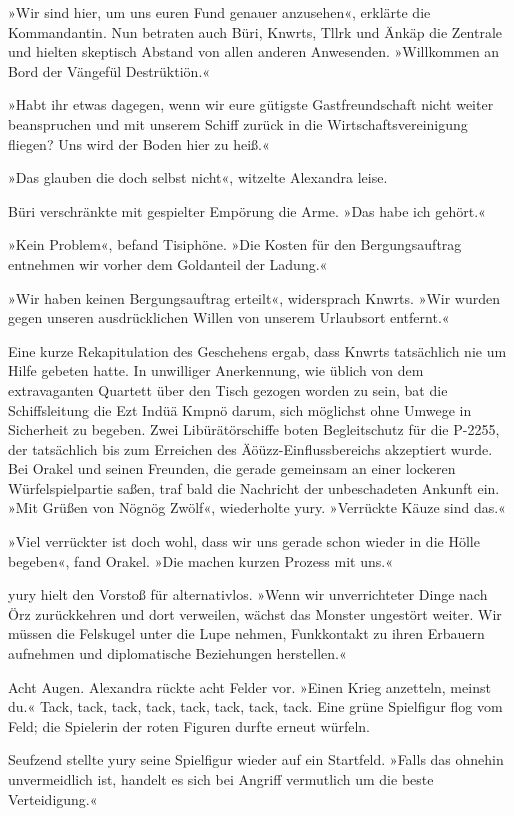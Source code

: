 »Wir sind hier, um uns euren Fund genauer anzusehen«, erklärte die Kommandantin. Nun betraten auch Büri, Knwrts, Tllrk und Änkäp die Zentrale und hielten skeptisch Abstand von allen anderen Anwesenden. »Willkommen an Bord der Vängefül Destrüktiön.«

»Habt ihr etwas dagegen, wenn wir eure gütigste Gastfreundschaft nicht weiter beanspruchen und mit unserem Schiff zurück in die Wirtschaftsvereinigung fliegen? Uns wird der Boden hier zu heiß.«

»Das glauben die doch selbst nicht«, witzelte Alexandra leise.

Büri verschränkte mit gespielter Empörung die Arme. »Das habe ich gehört.«

»Kein Problem«, befand Tisiphöne. »Die Kosten für den Bergungsauftrag entnehmen wir vorher dem Goldanteil der Ladung.«

»Wir haben keinen Bergungsauftrag erteilt«, widersprach Knwrts. »Wir wurden gegen unseren ausdrücklichen Willen von unserem Urlaubsort entfernt.«

Eine kurze Rekapitulation des Geschehens ergab, dass Knwrts tatsächlich nie um Hilfe gebeten hatte. In unwilliger Anerkennung, wie üblich von dem extravaganten Quartett über den Tisch gezogen worden zu sein, bat die Schiffsleitung die Ezt Indüä Kmpnö darum, sich möglichst ohne Umwege in Sicherheit zu begeben. Zwei Libürätörschiffe boten Begleitschutz für die P-2255, der tatsächlich bis zum Erreichen des Äöüzz-Einflussbereichs akzeptiert wurde. Bei Orakel und seinen Freunden, die gerade gemeinsam an einer lockeren Würfelspielpartie saßen, traf bald die Nachricht der unbeschadeten Ankunft ein. »Mit Grüßen von Nögnög Zwölf«, wiederholte yury. »Verrückte Käuze sind das.«

»Viel verrückter ist doch wohl, dass wir uns gerade schon wieder in die Hölle begeben«, fand Orakel. »Die machen kurzen Prozess mit uns.«

yury hielt den Vorstoß für alternativlos. »Wenn wir unverrichteter Dinge nach Örz zurückkehren und dort verweilen, wächst das Monster ungestört weiter. Wir müssen die Felskugel unter die Lupe nehmen, Funkkontakt zu ihren Erbauern aufnehmen und diplomatische Beziehungen herstellen.«

Acht Augen. Alexandra rückte acht Felder vor. »Einen Krieg anzetteln, meinst du.« Tack, tack, tack, tack, tack, tack, tack, tack. Eine grüne Spielfigur flog vom Feld; die Spielerin der roten Figuren durfte erneut würfeln.

Seufzend stellte yury seine Spielfigur wieder auf ein Startfeld. »Falls das ohnehin unvermeidlich ist, handelt es sich bei Angriff vermutlich um die beste Verteidigung.«

